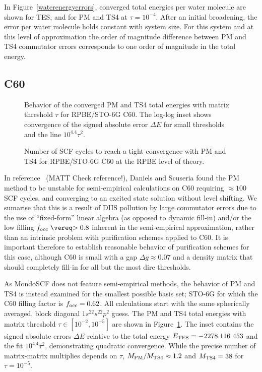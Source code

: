 \commentoutA{\documentclass[prb,aps,twocolumn,twocolumngrid,secnumarabic,superbib,hyperref]{revtex4}}
\begin{document}
{In Figure~\ref{waterenergyerrors}, 
converged total energies per water molecule are shown for TES, and for PM and TS4 at
$\tau=10^{-4}$.  After an initial broadening, the error per water molecule 
holds constant with system size.  For this system and at this level of 
approximation the order of magnitude difference between PM and TS4 commutator errors 
corresponds to one order of magnitude in the total energy.  

\subsection{C60}

\begin{figure}[h]
\caption{Behavior of the converged PM and TS4 total energies with matrix threshold $\tau$
         for RPBE/STO-6G C60.  The log-log inset shows 
         convergence of the signed absolute error $\Delta E$ for small 
         thresholds and the line $10^{4.4} \tau^2$.}\label{c60convergence}
\end{figure}

\begin{figure}[h]
\caption{Number of SCF cycles to reach a tight convergence with PM and TS4         
         for RPBE/STO-6G C60 at the RPBE level of theory.}\label{c60SCFs}
\end{figure}


In reference~ (MATT Check reference!), Daniels and Scuseria found the PM method to be 
unstable for semi-empirical calculations on C60 requiring  $\approx 100$ SCF
cycles, and converging to an excited state solution without level shifting.  
We sumarise that this is a result of DIIS pollution 
by large commutator errors due to the use of ``fixed-form'' 
linear algebra (as opposed to dynamic fill-in) and/or the low filling 
$f_{\rm occ} \gtrsim 0.8$ inherent in the semi-empirical approximation, rather
than an intrinsic problem with purification schemes applied to C60.   
It is important therefore to establish reasonable behavior of purification schemes 
for this case,  although  C60 is small with a gap $\Delta g\approx 0.07$ and a
density matrix that should completely fill-in for all but the most dire thresholds. 

As {\sc MondoSCF} does not feature semi-empirical methods, the behavior of PM and TS4 
is instead examined for the smallest possible basis set; STO-6G for which the 
C60 filling factor is $f_{\rm occ}=0.62$. All calculations start with the same spherically 
averaged, block diagonal $1s^22s^22p^2$ guess. The PM and TS4 total 
energies with matrix threshold $\tau \in [10^{-2},10^{-5}]$ are shown in 
Figure~\ref{c60convergence}.  The inset contains the signed absolute errors 
$\Delta E$ relative to the total energy $E_{\rm TES}=-2278.116~453$ and the fit 
$10^{4.4} \tau^2$, demonstrating quadratic convergence. 
While the precise number of matrix-matrix multiplies depends on $\tau$,
$M_{\rm PM}/M_{\rm TS4} \approx 1.2$ and $M_{\rm TS4}=38$ for $\tau=10^{-5}$.

}
\end{document}
